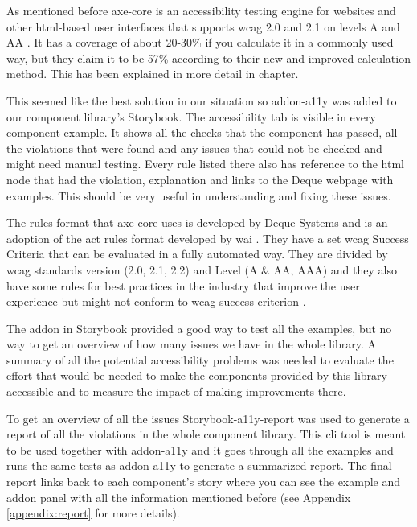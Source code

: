 \documentclass{master_thesis}
\begin{document}
As mentioned before axe-core is an accessibility testing engine for websites and other \ac{html}-based user interfaces that supports \ac{wcag} 2.0 and 2.1 on levels A and AA \citep{Deque2023}. It has a coverage of about 20-30\% if you calculate it in a commonly used way, but they claim it to be 57\% according to their new and improved calculation method. This has been explained in more detail in  chapter.

This seemed like the best solution in our situation so addon-a11y was added to our component library’s Storybook. The accessibility tab is visible in every component example. It shows all the checks that the component has passed, all the violations that were found and any issues that could not be checked and might need manual testing. Every rule listed there also has reference to the \ac{html} node that had the violation, explanation and links to the Deque webpage with examples. This should be very useful in understanding and fixing these issues.

The rules format that axe-core uses is developed by Deque Systems and is an adoption of the \ac{act} rules format developed by \ac{wai} \citep{Fiers2017}. They have a set \ac{wcag} Success Criteria that can be evaluated in a fully automated way. They are divided by \ac{wcag} standards version (2.0, 2.1, 2.2) and Level (A \& AA, AAA) and they also have some rules for best practices in the industry that improve the user experience but might not conform to \ac{wcag} success criterion \citep{Fiers2023}.

The addon in Storybook provided a good way to test all the examples, but no way to get an overview of how many issues we have in the whole library. A summary of all the potential accessibility problems was needed to evaluate the effort that would be needed to make the components provided by this library accessible and to measure the impact of making improvements there.

To get an overview of all the issues Storybook-a11y-report \citep{Karube2020} was used to generate a report of all the violations in the whole component library. This \ac{cli} tool is meant to be used together with addon-a11y and it goes through all the examples and runs the same tests as addon-a11y to generate a summarized report. The final report links back to each component's story where you can see the example and addon panel with all the information mentioned before (see Appendix \ref{appendix:report} for more details).
\end{document}
